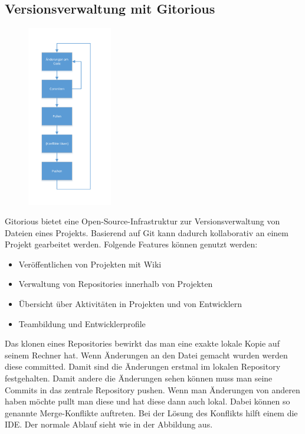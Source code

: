 \documentclass[]{article}
\begin{document}
\subsection{Versionsverwaltung mit Gitorious}
\begin{figure}
  \vspace{-80pt}
  \includegraphics[width=0.33\textwidth]{GitCycle}
  \label{fig:GitCycle}
  \vspace{-120pt}
\end{figure}

Gitorious bietet eine Open-Source-Infrastruktur zur  Versionsverwaltung von Dateien eines Projekts. Basierend auf Git kann dadurch kollaborativ an einem Projekt gearbeitet werden. Folgende Features können genutzt werden:
\begin{itemize}
\item Veröffentlichen von Projekten mit Wiki
\item Verwaltung von Repositories innerhalb von Projekten
\item Übersicht über Aktivitäten in Projekten und von Entwicklern
\item Teambildung und Entwicklerprofile
\end{itemize}
Das klonen eines Repositories bewirkt das man eine exakte lokale Kopie auf seinem Rechner hat. Wenn Änderungen an den Datei gemacht wurden werden diese committed. Damit sind die Änderungen erstmal im lokalen Repository festgehalten. Damit andere die Änderungen sehen können muss man seine Commits in das zentrale Repository pushen. Wenn man Änderungen von anderen haben möchte pullt man diese und hat diese dann auch lokal. Dabei können so genannte Merge-Konflikte auftreten. Bei der Lösung des Konflikts hilft einem die IDE. Der normale Ablauf sieht wie in der Abbildung aus.\\
\end{document}
